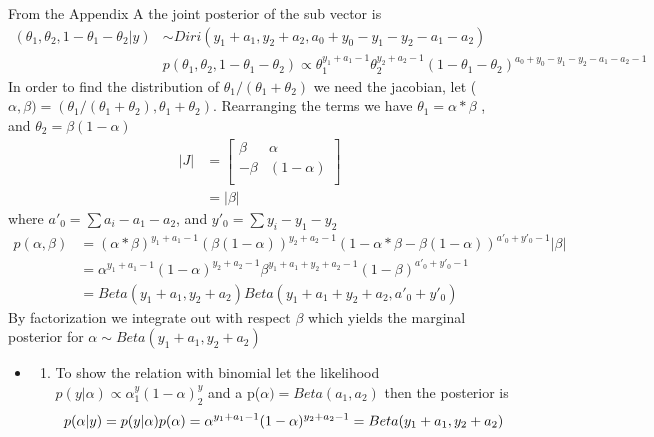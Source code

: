 \documentclass[
]{book}
\providecommand{\tightlist}{%
  \setlength{\itemsep}{0pt}\setlength{\parskip}{0pt}}
\theoremstyle{definition}
\theoremstyle{definition}
\theoremstyle{definition}
\theoremstyle{definition}
\theoremstyle{remark}
\begin{document}
From the Appendix A the joint posterior of the sub vector is
\[
\begin{aligned}
(\theta_1, \theta_2, 1-\theta_1-\theta_2| y ) &\sim Diri(y_1+a_1,y_2+a_2, a_0+y_0-y_1-y_2-a_1-a_2)\\
&p(\theta_1,\theta_2,1-\theta_1-\theta_2) \propto \theta_1^{y_1+a_1-1}\theta_2^{y_2+a_2-1}(1-\theta_1-\theta_2)^{a_0+y_0-y_1-y_2-a_1-a_2-1}
\end{aligned}
\]
In order to find the distribution of \(\theta_1/(\theta_1+\theta_2)\) we need the jacobian, let (\(\alpha,\beta) = (\theta_1/(\theta_1+\theta_2) , \theta_1+\theta_2)\).
Rearranging the terms we have \(\theta_1 = \alpha*\beta\) , and \(\theta_2= \beta(1-\alpha)\)
\[
\begin{aligned}
|J| &= \begin{bmatrix}
 \beta & \alpha \\
 -\beta & (1-\alpha)\\
\end{bmatrix} \\
 &=|\beta|
\end{aligned}
\]
where \(a'_0 = \sum a_i -a_1 -a_2\), and \(y'_0 =\sum y_i-y_1-y_2\)
\[
\begin{aligned}
p(\alpha,\beta) &= (\alpha*\beta)^{y_1+a_1-1}(\beta(1-\alpha))^{y_2+a_2-1}(1-\alpha*\beta-\beta(1-\alpha))^{a'_0+y'_0-1}|\beta|\\
&=\alpha^{y_1+a_1-1}(1-\alpha)^{y_2+a_2-1}\beta^{y_1+a_1+y_2+a_2-1}(1-\beta)^{a'_0+y'_0-1}\\
&= Beta(y_1+a_1,y_2+a_2)Beta(y_1+a_1+y_2+a_2, a'_0+y'_0)
\end{aligned}
\]
By factorization we integrate out with respect \(\beta\) which yields the marginal posterior for \(\alpha \sim Beta(y_1+a_1,y_2+a_2)\)

\begin{itemize}
\item
  \begin{enumerate}
  \def\labelenumi{(\alph{enumi})}
  \setcounter{enumi}{1}
  \tightlist
  \item
    To show the relation with binomial let the likelihood \(p(y|\alpha) \propto \alpha^y_1 (1-\alpha)^y_2\) and a p(\(\alpha)=Beta(a_1,a_2)\) then the posterior is
    \[
    p(\alpha | y) = p(y|\alpha)p(\alpha)\\
    = \alpha^{y_1+a_1-1}(1-\alpha)^{y_2+a_2-1}\\
    = Beta(y_1+a_1,y_2+a_2)
    \]
  \end{enumerate}
\end{itemize}
\end{document}
